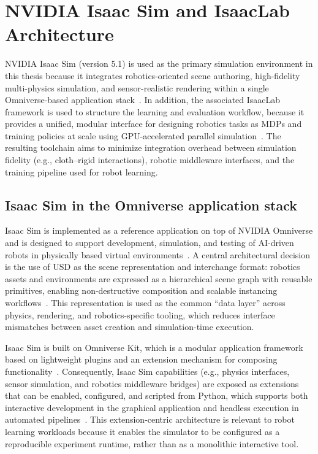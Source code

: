 \section{NVIDIA Isaac Sim and IsaacLab Architecture}
\label{sec:isaac_sim_isaaclab_architecture}

NVIDIA Isaac Sim (version 5.1) is used as the primary simulation environment in this thesis because it integrates robotics-oriented scene authoring, high-fidelity multi-physics simulation, and sensor-realistic rendering within a single Omniverse-based application stack~\cite{nvidia_isaac_sim_510_what_is}. In addition, the associated IsaacLab framework is used to structure the learning and evaluation workflow, because it provides a unified, modular interface for designing robotics tasks as \acp{MDP} and training policies at scale using GPU-accelerated parallel simulation~\cite{Mittal2025IsaacLab}. The resulting toolchain aims to minimize integration overhead between simulation fidelity (e.g., cloth--rigid interactions), robotic middleware interfaces, and the training pipeline used for robot learning.

\subsection{Isaac Sim in the Omniverse application stack}
Isaac Sim is implemented as a reference application on top of NVIDIA Omniverse and is designed to support development, simulation, and testing of AI-driven robots in physically based virtual environments~\cite{nvidia_isaac_sim_510_what_is}. A central architectural decision is the use of \ac{USD} as the scene representation and interchange format: robotics assets and environments are expressed as a hierarchical scene graph with reusable primitives, enabling non-destructive composition and scalable instancing workflows~\cite{nvidia_isaac_sim_510_what_is}. This representation is used as the common ``data layer'' across physics, rendering, and robotics-specific tooling, which reduces interface mismatches between asset creation and simulation-time execution.

Isaac Sim is built on Omniverse Kit, which is a modular application framework based on lightweight plugins and an extension mechanism for composing functionality~\cite{nvidia_isaac_sim_510_what_is}. Consequently, Isaac Sim capabilities (e.g., physics interfaces, sensor simulation, and robotics middleware bridges) are exposed as extensions that can be enabled, configured, and scripted from Python, which supports both interactive development in the graphical application and headless execution in automated pipelines~\cite{nvidia_isaac_sim_510_what_is}. This extension-centric architecture is relevant to robot learning workloads because it enables the simulator to be configured as a reproducible experiment runtime, rather than as a monolithic interactive tool.

